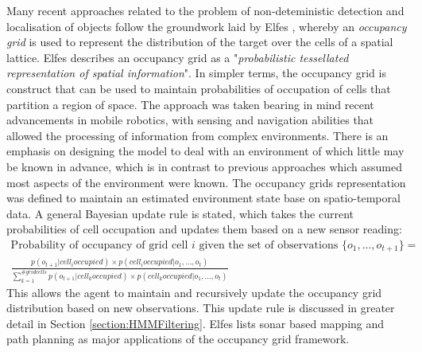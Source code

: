 Many recent approaches related to the problem of non-deteministic detection and localisation of objects follow the groundwork laid by Elfes \cite{Elfes1989UsingNavigation}, whereby an \textit{occupancy grid} is used to represent the distribution of the target over the cells of a spatial lattice. Elfes describes an occupancy grid as a "\textit{probabilistic tessellated representation of spatial information}". In simpler terms, the occupancy grid is construct that can be used to maintain probabilities of occupation of cells that partition a region of space. %
The approach was taken bearing in mind recent advancements in mobile robotics, with sensing and navigation abilities that allowed the processing of information from complex environments. There is an emphasis on designing the model to deal with an environment of which little may be known in advance, which is in contrast to previous approaches which assumed most aspects of the environment were known. The occupancy grids representation was defined to maintain an estimated environment state base on spatio-temporal data. A general Bayesian update rule is stated, which takes the current probabilities of cell occupation and updates them based on a new sensor reading: 
\begin{gather*}%
  \text{Probability of occupancy of grid cell } i \text{ given the set of observations } \{o_1, ..., o_{t+1}\} = \\
\frac{p(o_{t+1} | cell_i occupied) \times p(cell_i occupied | o_1, ..., o_t)}{\sum_{k=1}^{\# grid cells} p(o_{t+1} | cell_k occupied) \times p(cell_k occupied | o_1, ..., o_t)}
\end{gather*}
This allows the agent to maintain and recursively update the occupancy grid distribution based on new observations. This update rule is discussed in greater detail in Section \ref{section:HMMFiltering}. Elfes lists sonar based mapping and path planning as major applications of the occupancy grid framework.


